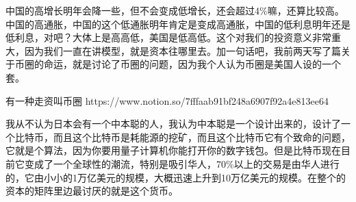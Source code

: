 \documentclass[UTF8, 12pt, a4paper]{ctexrep}
\begin{document}
中国的高增长明年会降一些，但不会变成低增长，还会超过4\%嘛，还算比较高。中国的高通胀，中国的这个低通胀明年肯定是变成高通胀，中国的低利息明年还是低利息，对吧？大体上是高高低，美国是低高低。这个对我们的投资意义非常重大，因为我们一直在讲模型，就是资本往哪里去。加一句话吧，我前两天写了篇关于币圈的命运，就是讨论了币圈的问题，因为我个人认为币圈是美国人设的一个套。

有一种走资叫币圈 https://www.notion.so/7fffaab91bf248a6907f92a4e813ee64

我从不认为日本会有一个中本聪的人，我认为中本聪是一个设计出来的，设计了一个比特币，而且这个比特币是耗能源的挖矿，而且这个比特币它有个致命的问题，它就是个算法，因为你要用量子计算机你能打开你的数字钱包。但是比特币现在目前它变成了一个全球性的潮流，特别是吸引华人，70\%以上的交易是由华人进行的，它由小小的1万亿美元的规模，大概迅速上升到10万亿美元的规模。在整个的资本的矩阵里边最讨厌的就是这个货币。
\end{document}
